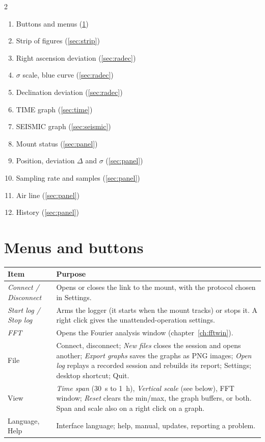 \begin{multicols}{2}
\begin{enumerate}
  \item Buttons and menus (\ref{sec:menus})
  \item Strip of figures (\ref{sec:strip})
  \item Right ascension deviation (\ref{sec:radec})
  \item $\sigma$ scale, blue curve (\ref{sec:radec})
  \item Declination deviation (\ref{sec:radec})
  \item TIME graph (\ref{sec:time})
  \item SEISMIC graph (\ref{sec:seismic})
  \item Mount status (\ref{sec:panel})
  \item Position, deviation $\Delta$ and $\sigma$ (\ref{sec:panel})
  \item Sampling rate and samples (\ref{sec:panel})
  \item Air line (\ref{sec:panel})
  \item History (\ref{sec:panel})
\end{enumerate}
\end{multicols}

\section{Menus and buttons}
\label{sec:menus}

\begin{center}
\begin{tabularx}{\textwidth}{lX}
\toprule
\textbf{Item} & \textbf{Purpose} \\
\midrule
\emph{Connect / Disconnect} & Opens or closes the link to the mount, with the
protocol chosen in Settings. \\
\emph{Start log / Stop log} & Arms the logger (it starts when the mount tracks)
or stops it. A right click gives the unattended-operation settings. \\
\emph{FFT} & Opens the Fourier analysis window (chapter~\ref{ch:fftwin}). \\
File & Connect, disconnect; \emph{New files} closes the session and opens
another; \emph{Export graphs} saves the graphs as PNG images; \emph{Open log}
replays a recorded session and rebuilds its report; Settings; desktop
shortcut; Quit. \\
View & \emph{Time span} (30~s to 1~h), \emph{Vertical scale} (see below), FFT
window; \emph{Reset} clears the min/max, the graph buffers, or both. Span and
scale also on a right click on a graph. \\
Language, Help & Interface language; help, manual, updates, reporting a
problem. \\
\bottomrule
\end{tabularx}
\end{center}

